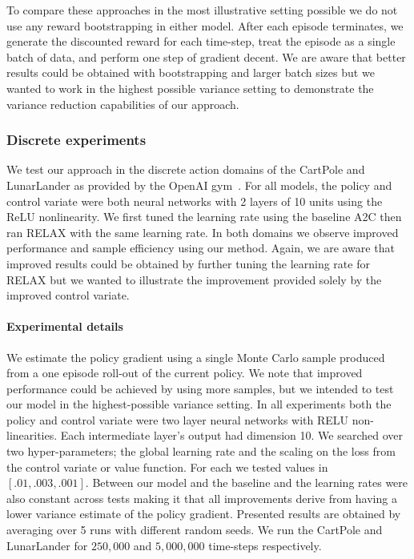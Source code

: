 \documentclass{article}
\newcommand{\RELAX}{{\textnormal{RELAX}}}
\begin{document}
To compare these approaches in the most illustrative setting possible we do not use any reward bootstrapping in either model.
After each episode terminates, we generate the discounted reward for each time-step, treat the episode as a single batch of data, and perform one step of gradient decent.
We are aware that better results could be obtained with bootstrapping and larger batch sizes but we wanted to work in the highest possible variance setting to demonstrate the variance reduction capabilities of our approach.


\subsubsection{Discrete experiments}
We test our approach in the discrete action domains of the CartPole and LunarLander as provided by the OpenAI gym~\cite{1606.01540}.
For all models, the policy and control variate were both neural networks with 2 layers of 10 units using the ReLU nonlinearity.
We first tuned the learning rate using the baseline A2C then ran \RELAX{} with the same learning rate. 
In both domains we observe improved performance and sample efficiency using our method.
Again, we are aware that improved results could be obtained by further tuning the learning rate for \RELAX{} but we wanted to illustrate the improvement provided solely by the improved control variate. 

\paragraph{Experimental details}
We estimate the policy gradient using a single Monte Carlo sample produced from a one episode roll-out of the current policy.
We note that improved performance could be achieved by using more samples, but we intended to test our model in the highest-possible variance setting. 
In all experiments both the policy and control variate were two layer neural networks with RELU non-linearities. Each intermediate layer's output had dimension 10.
We searched over two hyper-parameters; the global learning rate and the scaling on the loss from the control variate or value function.
For each we tested values in $[.01, .003, .001]$.
Between our model and the baseline and the learning rates were also constant across tests making it that all improvements derive from having a lower variance estimate of the policy gradient.
Presented results are obtained by averaging over 5 runs with different random seeds. We run the CartPole and LunarLander for $250,000$ and $5,000,000$ time-steps respectively. 
\end{document}
